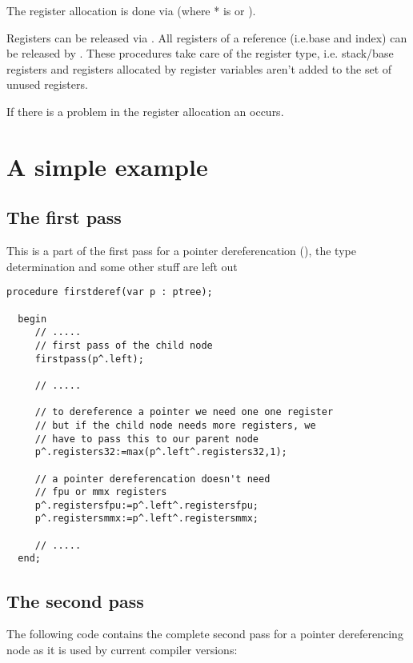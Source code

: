 \documentclass{report}
\begin{document}
The register allocation is done via 
(where * is  or ).

Registers can be released via . All registers
of a reference (i.e.base and index) can be released by
. These procedures take care of the register type,
i.e. stack/base registers and registers allocated by register
variables aren't added to the set of unused registers.

If there is a problem in the register allocation an 
occurs.

\section{A simple example}

\subsection{The first pass}

This is a part of the first pass for a pointer dereferencation
(), the type determination and some other stuff are left out

\begin{verbatim}
procedure firstderef(var p : ptree);

  begin
     // .....
     // first pass of the child node
     firstpass(p^.left);

     // .....

     // to dereference a pointer we need one one register
     // but if the child node needs more registers, we
     // have to pass this to our parent node
     p^.registers32:=max(p^.left^.registers32,1);

     // a pointer dereferencation doesn't need
     // fpu or mmx registers
     p^.registersfpu:=p^.left^.registersfpu;
     p^.registersmmx:=p^.left^.registersmmx;

     // .....
  end;
\end{verbatim}

\subsection{The second pass}

The following code contains the complete second pass for
a pointer dereferencing node as it is used by current
compiler versions:
\end{document}
